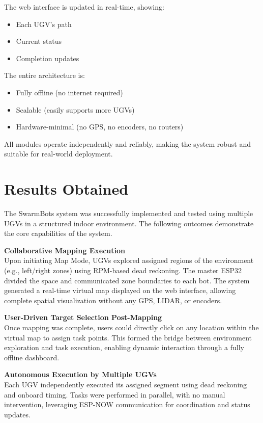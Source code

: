 \documentclass[a4paper,12pt]{report}
\begin{document}
The web interface is updated in real-time, showing:
\begin{itemize}
    \item Each UGV’s path
    \item Current status
    \item Completion updates
\end{itemize}

The entire architecture is:
\begin{itemize}
    \item Fully offline (no internet required)
    \item Scalable (easily supports more UGVs)
    \item Hardware-minimal (no GPS, no encoders, no routers)
\end{itemize}

All modules operate independently and reliably, making the system robust and suitable for real-world deployment.



\chapter{Results Obtained}
The SwarmBots system was successfully implemented and tested using multiple UGVs in a structured indoor environment. The following outcomes demonstrate the core capabilities of the system.

\textbf{Collaborative Mapping Execution} \\
Upon initiating Map Mode, UGVs explored assigned regions of the environment (e.g., left/right zones) using RPM-based dead reckoning. The master ESP32 divided the space and communicated zone boundaries to each bot. The system generated a real-time virtual map displayed on the web interface, allowing complete spatial visualization without any GPS, LIDAR, or encoders.

\textbf{User-Driven Target Selection Post-Mapping} \\
Once mapping was complete, users could directly click on any location within the virtual map to assign task points. This formed the bridge between environment exploration and task execution, enabling dynamic interaction through a fully offline dashboard.


\textbf{Autonomous Execution by Multiple UGVs} \\
Each UGV independently executed its assigned segment using dead reckoning and onboard timing. Tasks were performed in parallel, with no manual intervention, leveraging ESP-NOW communication for coordination and status updates.
\end{document}
